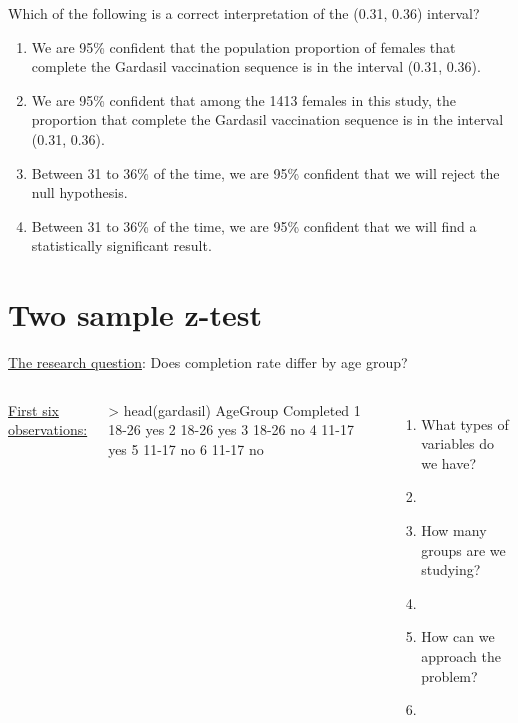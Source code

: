 \begin{frame}
\begin{clicker}{Which of the following is a correct interpretation of the (0.31, 0.36) interval?}
\begin{enumerate}
    \item
    We are 95\% confident that the population proportion of females that complete the Gardasil vaccination sequence is in the interval (0.31, 0.36).
    \item
    We are 95\% confident that among the 1413 females in this study, the proportion that complete the Gardasil vaccination sequence is in the interval (0.31, 0.36).
    \item
    Between 31 to 36\% of the time, we are 95\% confident that we will reject the null hypothesis.
    \item
    Between 31 to 36\% of the time, we are 95\% confident that we will find a statistically significant result.
\end{enumerate}
\end{clicker}

\end{frame}


\section[Two sample z-test]{Two sample z-test}
\begin{frame}
\end{frame}


\begin{frame}[fragile]
\underline{The research question}: Does completion rate differ by age group?
\vskip10pt
\begin{columns}
\underline{First six observations:}
\begin{lcverbatim}
> head(gardasil)
  AgeGroup      Completed
1    18-26           yes
2    18-26           yes
3    18-26            no
4    11-17           yes
5    11-17            no
6    11-17            no
\end{lcverbatim}
\begin{enumerate}
\item
What types of variables do we have?
\item[]
\item
How many groups are we studying?
\item[]
\item
How can we approach the problem?
\item[]
\end{enumerate}
\end{columns}
\end{frame}

